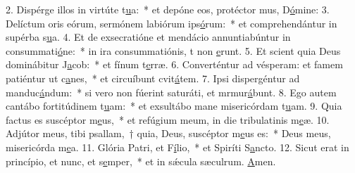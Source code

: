 2. Dispérge illos in virtúte t\uline{u}a:~* et depóne eos, protéctor mus, D\uline{ó}mine:
3. Delíctum oris eórum, sermónem labiórum ips\uline{ó}rum:~* et comprehendántur in supérba s\uline{u}a.
4. Et de exsecratióne et mendácio annuntiabúntur in consummati\uline{ó}ne:~* in ira consummatiónis, t non \uline{e}runt.
5. Et scient quia Deus dominábitur J\uline{a}cob:~* et fínum t\uline{e}rræ.
6. Converténtur ad vésperam: et famem patiéntur ut c\uline{a}nes,~* et circuíbunt cvit\uline{á}tem.
7. Ipsi dispergéntur ad manduc\uline{á}ndum:~* si vero non fúerint saturáti, et mrmur\uline{á}bunt.
8. Ego autem cantábo fortitúdinem t\uline{u}am:~* et exsultábo mane misericórdam t\uline{u}am.
9. Quia factus es suscéptor m\uline{e}us,~* et refúgium meum, in die tribulatinis m\uline{e}æ.
10. Adjútor meus, tibi psallam,~† quia, Deus, suscéptor m\uline{e}us es:~* Deus meus, misericórda m\uline{e}a.
11. Glória Patri, et F\uline{í}lio,~* et Spiríti S\uline{a}ncto.
12. Sicut erat in princípio, et nunc, et s\uline{e}mper,~* et in sǽcula sæculrum. \uline{A}men.
